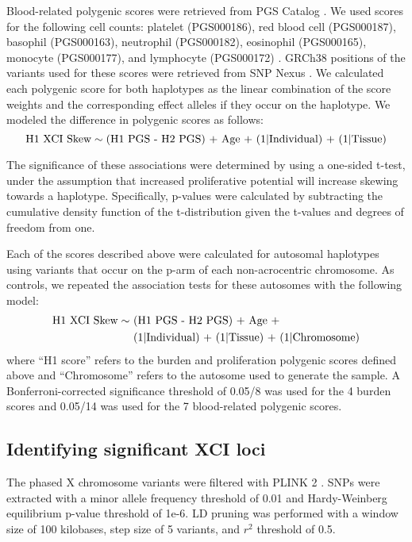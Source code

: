 Blood-related polygenic scores were retrieved from PGS Catalog \cite{Lambert2021-iu}. We used scores for the following cell counts: platelet (PGS000186), red blood cell (PGS000187), basophil (PGS000163), neutrophil (PGS000182), eosinophil (PGS000165), monocyte (PGS000177), and lymphocyte (PGS000172) \cite{Vuckovic2020-gf}. GRCh38 positions of the variants used for these scores were retrieved from SNP Nexus \cite{Oscanoa2020-ac}. We calculated each polygenic score for both haplotypes as the linear combination of the score weights and the corresponding effect alleles if they occur on the haplotype. We modeled the difference in polygenic scores as follows:
\begin{equation}
\text{H1 XCI Skew} \sim \text{(H1 PGS - H2 PGS) + Age + (1\textbar Individual) + (1\textbar Tissue)}
\end{equation}

The significance of these associations were determined by using a one-sided t-test, under the assumption that increased proliferative potential will increase skewing towards a haplotype. Specifically, p-values were calculated by subtracting the cumulative density function of the t-distribution given the t-values and degrees of freedom from one. 

Each of the scores described above were calculated for autosomal haplotypes using variants that occur on the p-arm of each non-acrocentric chromosome. As controls, we repeated the association tests for these autosomes with the following model:
\begin{align}
\begin{split}
\text{H1 XCI Skew} \sim & \text{ (H1 PGS - H2 PGS) + Age +} \\
                        & \text{ (1\textbar Individual) + (1\textbar Tissue) + (1\textbar Chromosome)}
\end{split}
\end{align}
where “H1 score” refers to the burden and proliferation polygenic scores defined above and “Chromosome” refers to the autosome used to generate the sample. A Bonferroni-corrected significance threshold of 0.05/8 was used for the 4 burden scores and 0.05/14 was used for the 7 blood-related polygenic scores. 

\subsection{Identifying significant XCI loci}

The phased X chromosome variants were filtered with PLINK 2 \cite{PLINK2}. SNPs were extracted with a minor allele frequency threshold of 0.01 and Hardy-Weinberg equilibrium p-value threshold of 1e-6. LD pruning was performed with a window size of 100 kilobases, step size of 5 variants, and $r^2$ threshold of 0.5. 

